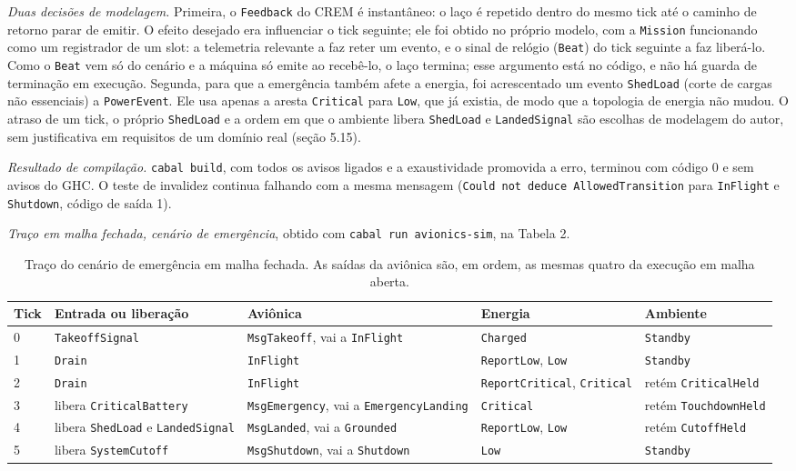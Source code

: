 \documentclass[12pt,a4paper]{article}
\begin{document}
\textit{Duas decisões de modelagem.} Primeira, o \texttt{Feedback} do CREM é instantâneo: o laço é repetido dentro do mesmo tick até o caminho de retorno parar de emitir. O efeito desejado era influenciar o tick seguinte; ele foi obtido no próprio modelo, com a \texttt{Mission} funcionando como um registrador de um slot: a telemetria relevante a faz reter um evento, e o sinal de relógio (\texttt{Beat}) do tick seguinte a faz liberá-lo. Como o \texttt{Beat} vem só do cenário e a máquina só emite ao recebê-lo, o laço termina; esse argumento está no código, e não há guarda de terminação em execução. Segunda, para que a emergência também afete a energia, foi acrescentado um evento \texttt{ShedLoad} (corte de cargas não essenciais) a \texttt{PowerEvent}. Ele usa apenas a aresta \texttt{Critical} para \texttt{Low}, que já existia, de modo que a topologia de energia não mudou. O atraso de um tick, o próprio \texttt{ShedLoad} e a ordem em que o ambiente libera \texttt{ShedLoad} e \texttt{LandedSignal} são escolhas de modelagem do autor, sem justificativa em requisitos de um domínio real (seção 5.15).

\textit{Resultado de compilação.} \texttt{cabal build}, com todos os avisos ligados e a exaustividade promovida a erro, terminou com código 0 e sem avisos do GHC. O teste de invalidez continua falhando com a mesma mensagem (\texttt{Could not deduce AllowedTransition} para \texttt{InFlight} e \texttt{Shutdown}, código de saída 1).

\textit{Traço em malha fechada, cenário de emergência}, obtido com \texttt{cabal run avionics-sim}, na Tabela 2.

\begin{table}[h]
\centering
\scriptsize
\begin{tabular}{|p{0.7cm}|p{3.1cm}|p{4.3cm}|p{3.0cm}|p{2.9cm}|}
\hline
Tick & Entrada ou liberação & Aviônica & Energia & Ambiente \\
\hline
0 & \texttt{TakeoffSignal} & \texttt{MsgTakeoff}, vai a \texttt{InFlight} & \texttt{Charged} & \texttt{Standby} \\
\hline
1 & \texttt{Drain} & \texttt{InFlight} & \texttt{ReportLow}, \texttt{Low} & \texttt{Standby} \\
\hline
2 & \texttt{Drain} & \texttt{InFlight} & \texttt{ReportCritical}, \texttt{Critical} & retém \texttt{CriticalHeld} \\
\hline
3 & libera \texttt{CriticalBattery} & \texttt{MsgEmergency}, vai a \texttt{EmergencyLanding} & \texttt{Critical} & retém \texttt{TouchdownHeld} \\
\hline
4 & libera \texttt{ShedLoad} e \texttt{LandedSignal} & \texttt{MsgLanded}, vai a \texttt{Grounded} & \texttt{ReportLow}, \texttt{Low} & retém \texttt{CutoffHeld} \\
\hline
5 & libera \texttt{SystemCutoff} & \texttt{MsgShutdown}, vai a \texttt{Shutdown} & \texttt{Low} & \texttt{Standby} \\
\hline
\end{tabular}
\caption{Traço do cenário de emergência em malha fechada. As saídas da aviônica são, em ordem, as mesmas quatro da execução em malha aberta.}
\end{table}
\end{document}
